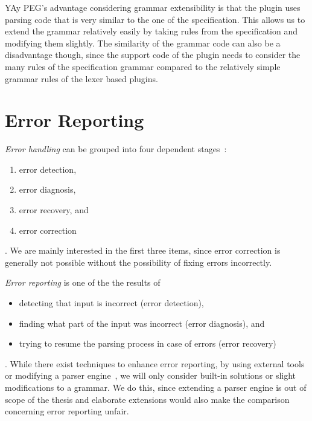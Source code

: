 YAy PEG’s advantage considering grammar extensibility is that the plugin uses parsing code that is very similar to the one of the  specification. This allows us to extend the grammar relatively easily by taking rules from the  specification and modifying them slightly. The similarity of the grammar code can also be a disadvantage though, since the support code of the plugin needs to consider the many rules of the specification grammar compared to the relatively simple grammar rules of the lexer based plugins.

\section{Error Reporting}
\label{sec:error_reporting}

\emph{Error handling} can be grouped into four dependent stages~\cite{ruefenacht2016error, pottier2016reachability}:

\begin{enumerate}
  \item error detection,
  \item error diagnosis,
  \item error recovery, and
  \item error correction
\end{enumerate}

. We are mainly interested in the first three items, since error correction is generally not possible without the possibility of fixing errors incorrectly.

\emph{Error reporting} is one of the the results of

\begin{itemize}
  \item detecting that input is incorrect (error detection),
  \item finding what part of the input was incorrect (error diagnosis), and
  \item trying to resume the parsing process in case of errors (error recovery)
\end{itemize}

. While there exist techniques to enhance error reporting, by using external tools or modifying a parser engine~\cite{jeffery2003generating, cox2010errors}, we will only consider built-in solutions or slight modifications to a grammar. We do this, since extending a parser engine is out of scope of the thesis and elaborate extensions would also make the comparison concerning error reporting unfair.

